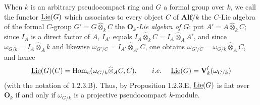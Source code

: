 When $k$ is an arbitrary pseudocompact ring and $G$ a formal group over $k$, we call the functor $\underline{\operatorname{Lie}}(G)$ which associates to every object $C$ of $\mathbf{Alf}/k$ the $C$-Lie algebra of the formal $C$-group $G'=G\widehat\otimes_k C$ the \emph{$\mathbf O_k$-Lie algebra of $G$}: put $A'=A\widehat\otimes_k C$; since $I_A$ is a direct factor of $A$, $I_{A'}$ equals $I_A\widehat\otimes_k C=I_A\widehat\otimes_A A'$, and since $\omega_{G/k}=I_A\widehat\otimes_A k$ and likewise $\omega_{G'/C}=I_{A'}\widehat\otimes_{A'}C$, one obtains $\omega_{G'/C}=\omega_{G/k}\widehat\otimes_A C$, and hence
\[
\underline{\operatorname{Lie}}(G)(C)=\operatorname{Hom}_c(\omega_{G/k}\widehat\otimes_A C,C),\qquad i.e.\kern.3em\quad\underline{\operatorname{Lie}}(G)=\mathbf V_k^{\mathrm f}(\omega_{G/k})
\]
(with the notation of 1.2.3.B). Thus, by Proposition 1.2.3.E, $\underline{\operatorname{Lie}}(G)$ is flat over $\mathbf O_k$ if and only if $\omega_{G/k}$ is a projective pseudocompact $k$-module.

